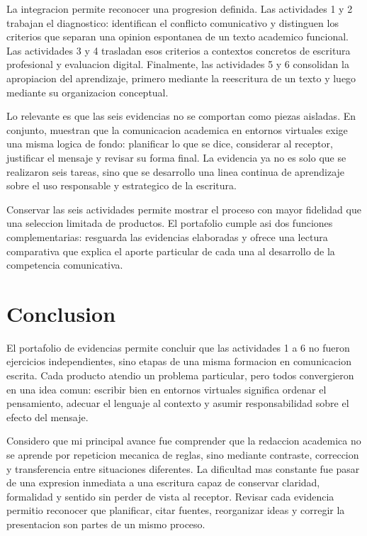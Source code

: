 \documentclass[
	spanish,
	letterpaper, oneside
]{article}
\begin{document}
La integracion permite reconocer una progresion definida. Las actividades 1 y 2 trabajan el diagnostico: identifican el conflicto comunicativo y distinguen los criterios que separan una opinion espontanea de un texto academico funcional. Las actividades 3 y 4 trasladan esos criterios a contextos concretos de escritura profesional y evaluacion digital. Finalmente, las actividades 5 y 6 consolidan la apropiacion del aprendizaje, primero mediante la reescritura de un texto y luego mediante su organizacion conceptual.

Lo relevante es que las seis evidencias no se comportan como piezas aisladas. En conjunto, muestran que la comunicacion academica en entornos virtuales exige una misma logica de fondo: planificar lo que se dice, considerar al receptor, justificar el mensaje y revisar su forma final. La evidencia ya no es solo que se realizaron seis tareas, sino que se desarrollo una linea continua de aprendizaje sobre el uso responsable y estrategico de la escritura.

Conservar las seis actividades permite mostrar el proceso con mayor fidelidad que una seleccion limitada de productos. El portafolio cumple asi dos funciones complementarias: resguarda las evidencias elaboradas y ofrece una lectura comparativa que explica el aporte particular de cada una al desarrollo de la competencia comunicativa.

\section{Conclusion}

El portafolio de evidencias permite concluir que las actividades 1 a 6 no fueron ejercicios independientes, sino etapas de una misma formacion en comunicacion escrita. Cada producto atendio un problema particular, pero todos convergieron en una idea comun: escribir bien en entornos virtuales significa ordenar el pensamiento, adecuar el lenguaje al contexto y asumir responsabilidad sobre el efecto del mensaje.

Considero que mi principal avance fue comprender que la redaccion academica no se aprende por repeticion mecanica de reglas, sino mediante contraste, correccion y transferencia entre situaciones diferentes. La dificultad mas constante fue pasar de una expresion inmediata a una escritura capaz de conservar claridad, formalidad y sentido sin perder de vista al receptor. Revisar cada evidencia permitio reconocer que planificar, citar fuentes, reorganizar ideas y corregir la presentacion son partes de un mismo proceso.
\end{document}
